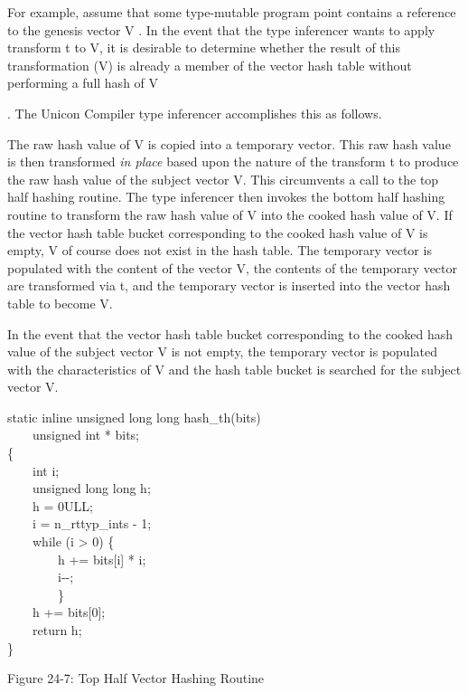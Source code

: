 For example, assume that some type-mutable program point contains a
reference to the genesis vector V {}. In the event
that the type inferencer wants to apply transform t{}
to V{}, it is desirable to determine whether the
result of this transformation (V{}) is already a
member of the vector hash table without performing a full hash of
V{. The Unicon Compiler type inferencer accomplishes
this as follows.

The raw hash value of V{} is copied into a temporary
vector. This raw hash value is then transformed {\textit{in place}}
based upon the nature of the transform t{} to produce
the raw hash value of the subject vector V{}. This
circumvents a call to the top half hashing routine. The type
inferencer then invokes the bottom half hashing routine to transform
the raw hash value of V{} into the cooked hash value
of V{}. If the vector hash table bucket corresponding
to the cooked hash value of V{} is empty,
V{} of course does not exist in the hash table.  The
temporary vector is populated with the content of the vector
V{}, the contents of the temporary vector are
transformed via t{}, and the temporary vector is
inserted into the vector hash table to become
V{}.

In the event that the vector hash table bucket corresponding to the
cooked hash value of the subject vector V{} is not
empty, the temporary vector is populated with the characteristics of
V{} and the hash table bucket is searched for the
subject vector V{}.


\bigskip

\begin{iconcode}
static inline unsigned long long hash\_th(bits) \\
\ \ \ \ unsigned int * bits; \\
\{ \\
\ \ \ \ int i; \\
\ \ \ \ unsigned long long h; \\
\ \ \ \ h = 0ULL; \\
\ \ \ \ i = n\_rttyp\_ints - 1; \\
\ \ \ \ while (i {\textgreater} 0) \{ \\
\ \ \ \ \ \ \ \ h += bits[i] * i; \\
\ \ \ \ \ \ \ \ i-{}-; \\
\ \ \ \ \ \ \ \ \} \\
\ \ \ \ h += bits[0]; \\
\ \ \ \ return h; \\
\}
\end{iconcode}
{\centering
Figure 24-7: Top Half Vector Hashing Routine
\par}

}
